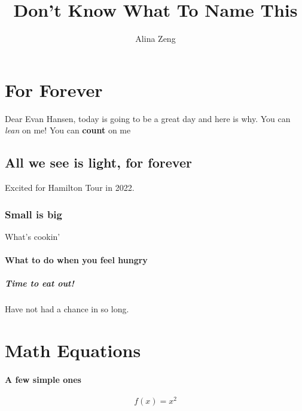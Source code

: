 \documentclass[a4paper, 12pt]{article}
\author{Alina Zeng}
\title{Don't Know What To Name This}
\begin{document}
\maketitle
\newpage
{}   %


\tableofcontents
\newpage  %

\section{For Forever}
Dear Evan Hansen, today is going to be a great day and here is why. \newline
You can \textsl{lean} on me!
You can \textbf{count} on me~ \newline


\subsection{All we see is light, for forever}
Excited for Hamilton Tour in 2022. \newline

\subsubsection {{\small Small} is {\Large big}}
What's cookin'

\paragraph {What to do when you feel hungry}

\subparagraph {Time to eat out!} Have not had a chance in so long.

\section{Math Equations}
\paragraph {A few simple ones}
\begin{equation*}
  f(x) = x^2
\end{equation*}
\end{document}

